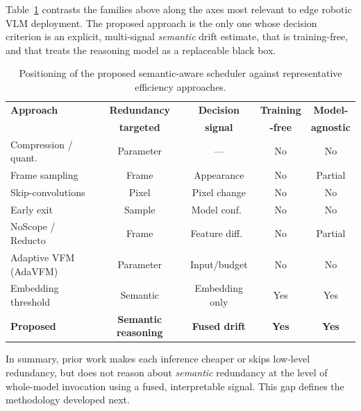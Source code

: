 Table~\ref{tab:lit-comparison} contrasts the families above along the axes
most relevant to edge robotic VLM deployment. The proposed approach is the
only one whose decision criterion is an explicit, multi-signal \emph{semantic}
drift estimate, that is training-free, and that treats the reasoning model as
a replaceable black box.

\begin{table}[htbp]
\centering
\caption[Comparison of efficiency approaches]{Positioning of the proposed
semantic-aware scheduler against representative efficiency approaches.}
\label{tab:lit-comparison}
\small
\begin{tabular}{@{}lcccc@{}}
\toprule
\textbf{Approach} & \textbf{Redundancy} & \textbf{Decision} & \textbf{Training} & \textbf{Model-} \\
 & \textbf{targeted} & \textbf{signal} & \textbf{-free} & \textbf{agnostic} \\
\midrule
Compression / quant.\          & Parameter & ---            & No  & No  \\
Frame sampling                 & Frame     & Appearance     & No  & Partial \\
Skip-convolutions              & Pixel     & Pixel change   & No  & No  \\
Early exit                     & Sample    & Model conf.\   & No  & No  \\
NoScope / Reducto              & Frame     & Feature diff.\ & No  & Partial \\
Adaptive VFM (AdaVFM)          & Parameter & Input/budget   & No  & No  \\
Embedding threshold            & Semantic  & Embedding only & Yes & Yes \\
\textbf{Proposed}              & \textbf{Semantic reasoning} & \textbf{Fused drift} & \textbf{Yes} & \textbf{Yes} \\
\bottomrule
\end{tabular}
\end{table}

In summary, prior work makes each inference cheaper or skips low-level
redundancy, but does not reason about \emph{semantic} redundancy at the level
of whole-model invocation using a fused, interpretable signal. This gap
defines the methodology developed next.
